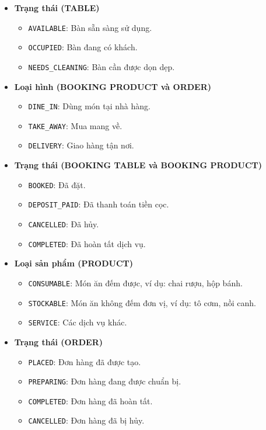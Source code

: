 \begin{itemize}
  \item \textbf{Trạng thái (TABLE)}
    \begin{itemize}
        \item \texttt{AVAILABLE}: Bàn sẵn sàng sử dụng.
        \item \texttt{OCCUPIED}: Bàn đang có khách.
        \item \texttt{NEEDS\_CLEANING}: Bàn cần được dọn dẹp.
    \end{itemize}

  \item \textbf{Loại hình (BOOKING PRODUCT và ORDER)}
    \begin{itemize}
        \item \texttt{DINE\_IN}: Dùng món tại nhà hàng.
        \item \texttt{TAKE\_AWAY}: Mua mang về.
        \item \texttt{DELIVERY}: Giao hàng tận nơi.
    \end{itemize}

  \item \textbf{Trạng thái (BOOKING TABLE và BOOKING PRODUCT)}
    \begin{itemize}
        \item \texttt{BOOKED}: Đã đặt.
        \item \texttt{DEPOSIT\_PAID}: Đã thanh toán tiền cọc.
        \item \texttt{CANCELLED}: Đã hủy.
        \item \texttt{COMPLETED}: Đã hoàn tất dịch vụ.
    \end{itemize}

  \item \textbf{Loại sản phẩm (PRODUCT)}
    \begin{itemize}
        \item \texttt{CONSUMABLE}: Món ăn đếm được, ví dụ: chai rượu, hộp bánh.
        \item \texttt{STOCKABLE}: Món ăn không đếm đơn vị, ví dụ: tô cơm, nồi canh.
        \item \texttt{SERVICE}: Các dịch vụ khác.
    \end{itemize}

  \item \textbf{Trạng thái (ORDER)}
    \begin{itemize}
        \item \texttt{PLACED}: Đơn hàng đã được tạo.
        \item \texttt{PREPARING}: Đơn hàng đang được chuẩn bị.
        \item \texttt{COMPLETED}: Đơn hàng đã hoàn tất.
        \item \texttt{CANCELLED}: Đơn hàng đã bị hủy.
    \end{itemize}


\end{itemize}
